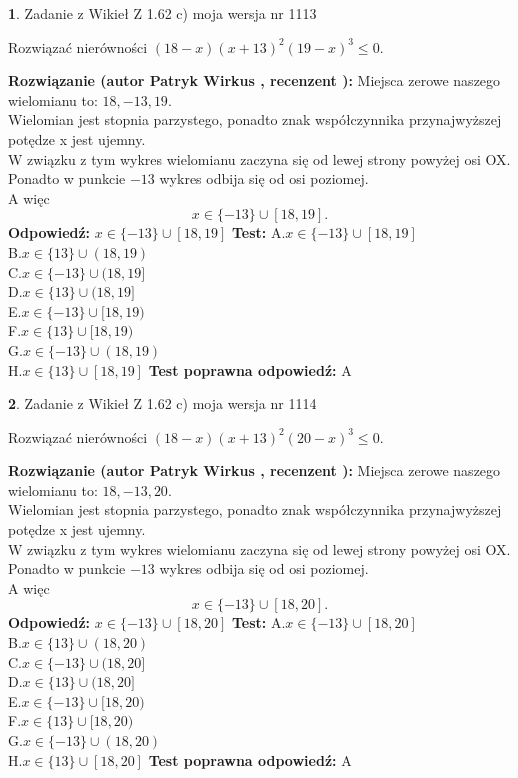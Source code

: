 \documentclass[12pt, a4paper]{article}
\theoremstyle{definition} %
\newtheorem{zad}{}
\newcommand{\zadStart}[1]{\begin{zad}#1\newline}
\newcommand{\zadStop}{\end{zad}}
\newcommand{\rozwStart}[2]{\noindent \textbf{Rozwiązanie (autor #1 , recenzent #2): }\newline}
\newcommand{\rozwStop}{\newline}
\newcommand{\odpStart}{\noindent \textbf{Odpowiedź:}\newline}
\newcommand{\odpStop}{\newline}
\newcommand{\testStart}{\noindent \textbf{Test:}\newline}
\newcommand{\testStop}{\newline}
\newcommand{\kluczStart}{\noindent \textbf{Test poprawna odpowiedź:}\newline}
\newcommand{\kluczStop}{\newline}
\begin{document}
\zadStart{Zadanie z Wikieł Z 1.62 c) moja wersja nr 1113}

Rozwiązać nierówności $(18-x)(x+13)^{2}(19-x)^{3}\le0$.
\zadStop
\rozwStart{Patryk Wirkus}{}
Miejsca zerowe naszego wielomianu to: $18, -13, 19$.\\
Wielomian jest stopnia parzystego, ponadto znak współczynnika przy\linebreak najwyższej potędze x jest ujemny.\\ W związku z tym wykres wielomianu zaczyna się od lewej strony powyżej osi OX.\\
Ponadto w punkcie $-13$ wykres odbija się od osi poziomej.\\
A więc $$x \in \{-13\} \cup [18,19].$$
\rozwStop
\odpStart
$x \in \{-13\} \cup [18,19]$
\odpStop
\testStart
A.$x \in \{-13\} \cup [18,19]$\\
B.$x \in \{13\} \cup (18,19)$\\
C.$x \in \{-13\} \cup (18,19]$\\
D.$x \in \{13\} \cup (18,19]$\\
E.$x \in \{-13\} \cup [18,19)$\\
F.$x \in \{13\} \cup [18,19)$\\
G.$x \in \{-13\} \cup (18,19)$\\
H.$x \in \{13\} \cup [18,19]$
\testStop
\kluczStart
A
\kluczStop



\zadStart{Zadanie z Wikieł Z 1.62 c) moja wersja nr 1114}

Rozwiązać nierówności $(18-x)(x+13)^{2}(20-x)^{3}\le0$.
\zadStop
\rozwStart{Patryk Wirkus}{}
Miejsca zerowe naszego wielomianu to: $18, -13, 20$.\\
Wielomian jest stopnia parzystego, ponadto znak współczynnika przy\linebreak najwyższej potędze x jest ujemny.\\ W związku z tym wykres wielomianu zaczyna się od lewej strony powyżej osi OX.\\
Ponadto w punkcie $-13$ wykres odbija się od osi poziomej.\\
A więc $$x \in \{-13\} \cup [18,20].$$
\rozwStop
\odpStart
$x \in \{-13\} \cup [18,20]$
\odpStop
\testStart
A.$x \in \{-13\} \cup [18,20]$\\
B.$x \in \{13\} \cup (18,20)$\\
C.$x \in \{-13\} \cup (18,20]$\\
D.$x \in \{13\} \cup (18,20]$\\
E.$x \in \{-13\} \cup [18,20)$\\
F.$x \in \{13\} \cup [18,20)$\\
G.$x \in \{-13\} \cup (18,20)$\\
H.$x \in \{13\} \cup [18,20]$
\testStop
\kluczStart
A
\kluczStop
\end{document}
